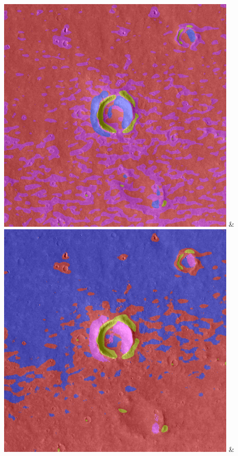 \begin{table}[h!]
\begin{tabularx}{\textwidth}
		\includegraphics[width=0.9\linewidth]{images/gen/filter_size/p03_01.png_1.00.png} &
		\includegraphics[width=0.9\linewidth]{images/gen/filter_size/p03_01.png_1.25.png} &

\end{tabularx}
\end{table}
